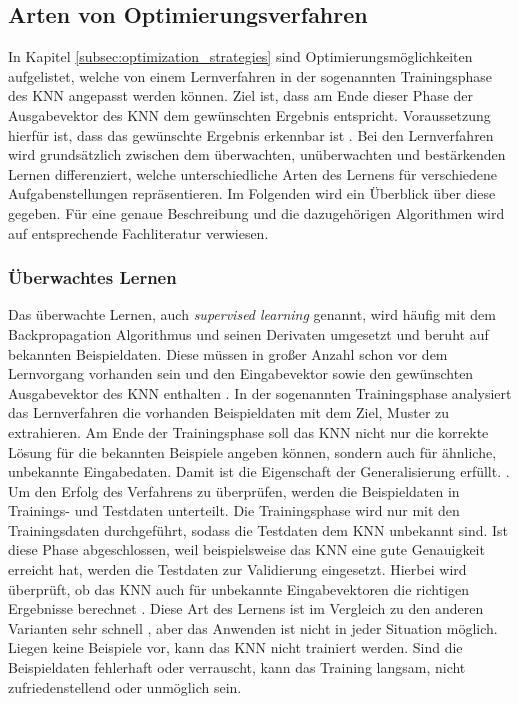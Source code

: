 \subsection{Arten von Optimierungsverfahren}
\label{subsec:learning_in_neural_networks}
In Kapitel \ref{subsec:optimization_strategies} sind Optimierungsmöglichkeiten aufgelistet, welche von einem Lernverfahren in der sogenannten Trainingsphase des \ac{KNN} angepasst werden können. Ziel ist, dass am Ende dieser Phase der Ausgabevektor des \ac{KNN} dem gewünschten Ergebnis entspricht. Voraussetzung hierfür ist, dass das gewünschte Ergebnis erkennbar ist \cite{zell2003simulation}. Bei den Lernverfahren wird grundsätzlich zwischen dem überwachten, unüberwachten und bestärkenden Lernen differenziert, welche unterschiedliche Arten des Lernens für verschiedene Aufgabenstellungen repräsentieren. Im Folgenden wird ein Überblick über diese gegeben. Für eine genaue Beschreibung und die dazugehörigen Algorithmen wird auf entsprechende Fachliteratur verwiesen.

\subsubsection{Überwachtes Lernen}
\label{subsubsec:supervised_learning}
Das überwachte Lernen, auch \emph{supervised learning} genannt, wird häufig mit dem Backpropagation Algorithmus und seinen Derivaten umgesetzt und beruht auf bekannten Beispieldaten. Diese müssen in großer Anzahl schon vor dem Lernvorgang vorhanden sein und den Eingabevektor sowie den gewünschten Ausgabevektor des \ac{KNN} enthalten \cite{zell2003simulation}. In der sogenannten Trainingsphase analysiert das Lernverfahren die vorhanden Beispieldaten mit dem Ziel, Muster zu extrahieren. Am Ende der Trainingsphase soll das \ac{KNN} nicht nur die korrekte Lösung für die bekannten Beispiele angeben können, sondern auch für ähnliche, unbekannte Eingabedaten. Damit ist die Eigenschaft der Generalisierung erfüllt. \cite{zell2003simulation}. Um den Erfolg des Verfahrens zu überprüfen, werden die Beispieldaten in Trainings- und Testdaten unterteilt. Die Trainingsphase wird nur mit den Trainingsdaten durchgeführt, sodass die Testdaten dem \ac{KNN} unbekannt sind. Ist diese Phase abgeschlossen, weil beispielsweise das \ac{KNN} eine gute Genauigkeit erreicht hat, werden die Testdaten zur Validierung eingesetzt. Hierbei wird überprüft, ob das \ac{KNN} auch für unbekannte Eingabevektoren die richtigen Ergebnisse berechnet \cite{kriesel2008kleiner}. Diese Art des Lernens ist im Vergleich zu den anderen Varianten sehr schnell \cite{zell2003simulation}, aber das Anwenden ist nicht in jeder Situation möglich. Liegen keine Beispiele vor, kann das \ac{KNN} nicht trainiert werden. Sind die Beispieldaten fehlerhaft oder verrauscht, kann das Training langsam, nicht zufriedenstellend oder unmöglich sein.

